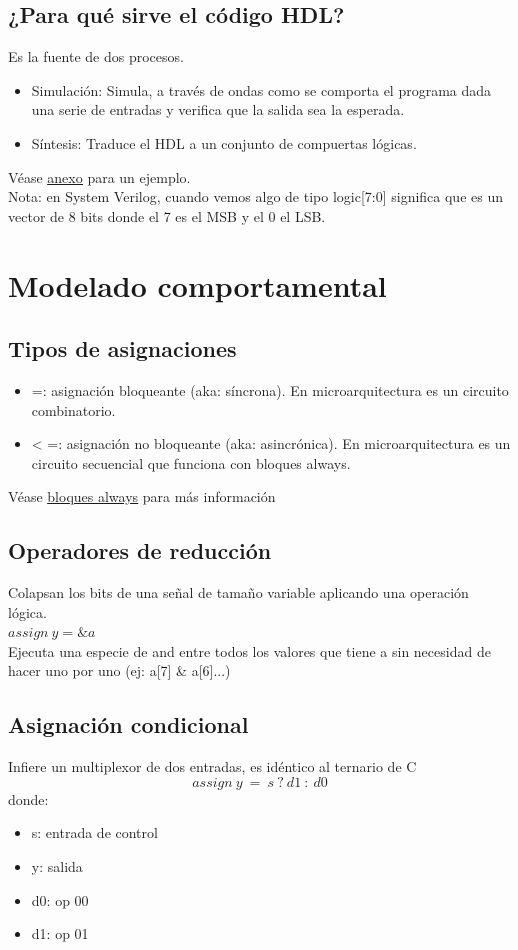 \documentclass[10pt,a4paper]{article}
\begin{document}
\subsection*{¿Para qué sirve el código HDL?}
Es la fuente de dos procesos.
\begin{itemize}
    \item Simulación: Simula, a través de ondas como se comporta el programa dada una serie de entradas y verifica que la salida sea la esperada.
    \item Síntesis: Traduce el HDL a un conjunto de compuertas lógicas.
\end{itemize}
Véase \hyperref[subsec:SVL_S_S]{\underline{anexo}} para un ejemplo. \\ 
Nota: en System Verilog, cuando vemos algo de tipo logic[7:0] significa que es un vector de 8 bits donde el 7 es el MSB y el 0 el LSB.
\section*{Modelado comportamental}
\subsection*{Tipos de asignaciones}
\begin{itemize}
    \item =: asignación bloqueante (aka: síncrona). En microarquitectura es un circuito combinatorio. 
    \item < =: asignación no bloqueante (aka: asincrónica). En microarquitectura es un circuito secuencial que funciona con bloques always. 
\end{itemize}
Véase \hyperref[subsec:bloques_always]{\underline{bloques always}} para más información
\subsection*{Operadores de reducción}
Colapsan los bits de una señal de tamaño variable aplicando una operación lógica. \\
$assign \ y = \&a$ \\
Ejecuta una especie de and entre todos los valores que tiene a sin necesidad de hacer uno por uno (ej: a[7] \& a[6]...) \\
\subsection*{Asignación condicional}
Infiere un multiplexor de dos entradas, es idéntico al ternario de C 
\[assign \ y \ = \ s \ ? \ d1 \ : \ d0\] 
donde:
\begin{itemize}
    \item s: entrada de control
    \item y: salida 
    \item d0: op 00 
    \item d1: op 01
\end{itemize}
\end{document}
